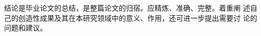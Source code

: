 \begin{conclusion}
  结论是毕业论文的总结，是整篇论文的归宿。应精炼、准确、完整。着重阐
  述自己的创造性成果及其在本研究领域中的意义、作用，还可进一步提出需要讨
  论的问题和建议。
\end{conclusion}